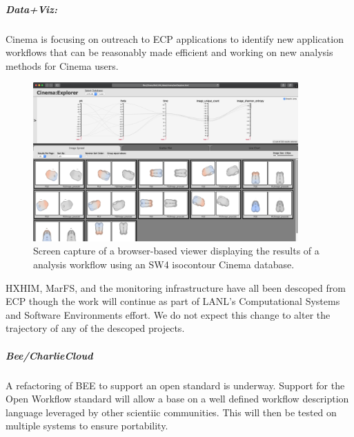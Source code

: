 \subparagraph{Data+Viz:}
Cinema is focusing on outreach to ECP applications to identify new application workflows that can be reasonably made efficient and working on new analysis methods for Cinema users.

\begin{figure}[htb]
	\centering
	\includegraphics[width=4in]{projects/2.3.6-NNSA/2.3.6.01-LANL-ATDM/cinema-sw4-example.png}
	\caption{
		Screen capture of a browser-based viewer displaying the results of a analysis workflow using an SW4 isocontour Cinema database.  
	\label{fig:cinema-sw4example}
	}
\end{figure}

HXHIM, MarFS, and the monitoring infrastructure have all been descoped
from ECP though the work will continue as part of LANL's Computational Systems
and Software Environments effort. We do not expect this change to alter the
trajectory of any of the descoped projects.

\subparagraph{Bee/CharlieCloud}
A refactoring of BEE to support an open standard is underway. Support for the Open Workflow standard will allow a base on a well defined workflow description language leveraged by other scientiic communities. This will then be tested on multiple systems to ensure portability.
